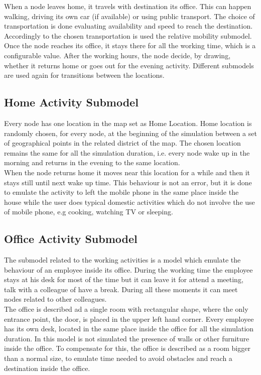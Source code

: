 When a node leaves home, it travels with destination its office. This can happen walking, driving its own car (if available) or using public transport. The choice of transportation is done evaluating availability and speed to reach the destination. Accordingly to the chosen transportation is used the relative mobility submodel.
\\

Once the node reaches its office, it stays there for all the working time, which is a configurable value. After the working hours, the node decide, by drawing, whether it returns home or goes out for the evening activity. Different submodels are used again for transitions between the locations.


\subsection{Home Activity Submodel}
Every node has one location in the map set as Home Location. Home location is randomly chosen, for every node, at the beginning of the simulation between a set of geographical points in the related district of the map. The chosen location remains the same for all the simulation duration, i.e. every node wake up in the morning and returns in the evening to the same location.
\\

When the node returns home it moves near this location for a while and then it stays still until next wake up time. This behaviour is not an error, but it is done to emulate the activity to left the mobile phone in the same place inside the house while the user does typical domestic activities which do not involve the use of mobile phone, e.g cooking, watching TV or sleeping.

\subsection{Office Activity Submodel}
The submodel related to the working activities is a model which emulate the behaviour of an employee inside its office. During the working time the employee stays at his desk for most of the time but it can leave it for attend a meeting, talk with a colleague of have a break. During all these moments it can meet nodes related to other colleagues.
\\

The office is described ad a single room with rectangular shape, where the only entrance point, the door, is placed in the upper left hand corner. Every employee has its own desk, located in the same place inside the office for all the simulation duration. In this model is not simulated the presence of walls or other furniture inside the office. To compensate for this, the office is described as a room bigger than a normal size, to emulate time needed to avoid obstacles and reach a destination inside the office.
\\

